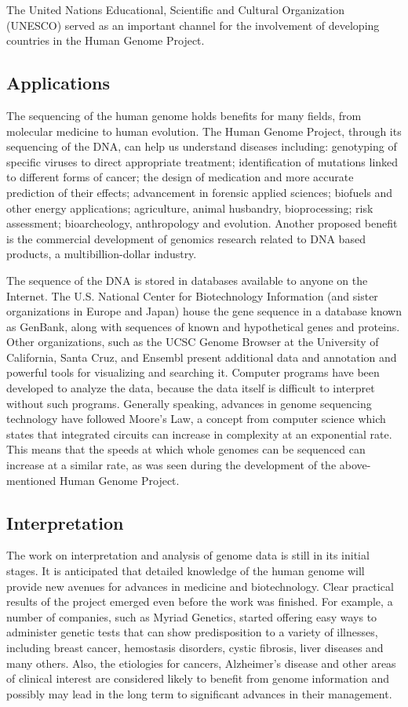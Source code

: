 \documentclass[12pt]{article}
\begin{document}
The United Nations Educational, Scientific and Cultural Organization (UNESCO) served as an important channel for the involvement of developing countries in the Human Genome Project.

\subsection{Applications}

The sequencing of the human genome holds benefits for many fields, from molecular medicine to human evolution. The Human Genome Project, through its sequencing of the DNA, can help us understand diseases including: genotyping of specific viruses to direct appropriate treatment; identification of mutations linked to different forms of cancer; the design of medication and more accurate prediction of their effects; advancement in forensic applied sciences; biofuels and other energy applications; agriculture, animal husbandry, bioprocessing; risk assessment; bioarcheology, anthropology and evolution. Another proposed benefit is the commercial development of genomics research related to DNA based products, a multibillion-dollar industry.

The sequence of the DNA is stored in databases available to anyone on the Internet. The U.S. National Center for Biotechnology Information (and sister organizations in Europe and Japan) house the gene sequence in a database known as GenBank, along with sequences of known and hypothetical genes and proteins. Other organizations, such as the UCSC Genome Browser at the University of California, Santa Cruz, and Ensembl present additional data and annotation and powerful tools for visualizing and searching it. Computer programs have been developed to analyze the data, because the data itself is difficult to interpret without such programs. Generally speaking, advances in genome sequencing technology have followed Moore’s Law, a concept from computer science which states that integrated circuits can increase in complexity at an exponential rate. This means that the speeds at which whole genomes can be sequenced can increase at a similar rate, as was seen during the development of the above-mentioned Human Genome Project.

\subsection{Interpretation}
The work on interpretation and analysis of genome data is still in its initial stages. It is anticipated that detailed knowledge of the human genome will provide new avenues for advances in medicine and biotechnology. Clear practical results of the project emerged even before the work was finished. For example, a number of companies, such as Myriad Genetics, started offering easy ways to administer genetic tests that can show predisposition to a variety of illnesses, including breast cancer, hemostasis disorders, cystic fibrosis, liver diseases and many others. Also, the etiologies for cancers, Alzheimer's disease and other areas of clinical interest are considered likely to benefit from genome information and possibly may lead in the long term to significant advances in their management.
\end{document}
